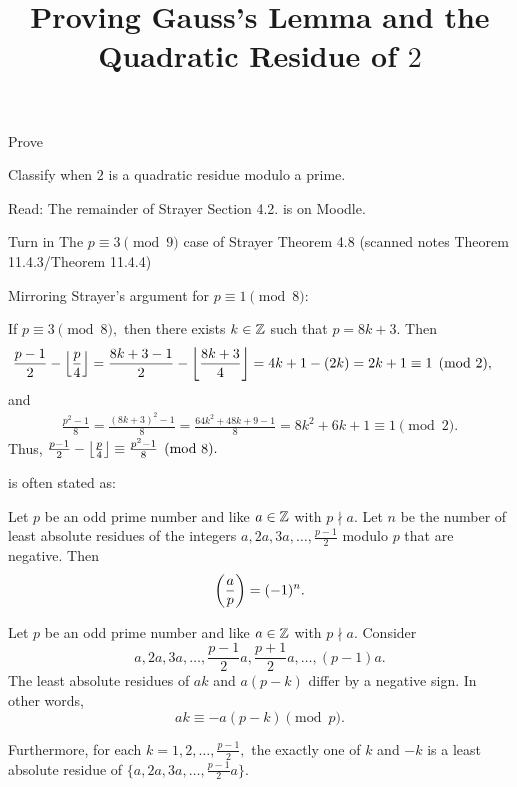 \documentclass{ximera}
\title{Proving Gauss's Lemma and the Quadratic Residue of $2$}
\begin{document}
\begin{abstract}
\end{abstract}
\maketitle

\begin{obj}
    \item Prove 
	\item Classify when $2$ is a quadratic residue modulo a prime.
\end{obj}


\begin{pre}
    \item[Read:] The remainder of Strayer Section 4.2. 
	is on Moodle.
    \item[Turn in] The $p\equiv 3\pmod{9}$
	 case of Strayer Theorem 4.8 (scanned notes Theorem 11.4.3/Theorem 11.4.4)

	 \begin{solution}
		Mirroring Strayer's argument for $p\equiv 1\pmod{8}:$

		If $p\equiv 3\pmod{8},$ then there exists $k\in\mathbb Z$ such that $p=8k+3.$ Then 
			\begin{align*}
				\frac{p-1}{2}-\left\lfloor  \frac{p}{4}\right\rfloor
				&=\frac{8k+3-1}{2}-\left\lfloor \frac{8k+3}{4}\right\rfloor
				=4k+1-(2k)=2k+1
				\equiv 1\pmod{2},
			\end{align*}
		and 
			\begin{align*}
				\frac{p^2-1}{8}=\frac{(8k+3)^2-1}{8}=\frac{64k^2+48k+9-1}{8}=8k^2+6k+1\equiv 1\pmod{2}.
			\end{align*}
		Thus, $\frac{p-1}{2}-\left\lfloor  \frac{p}{4}\right\rfloor\equiv \frac{p^2-1}{8}\pmod{8}.$
	 \end{solution}
\end{pre}


\begin{remark}
	 is often stated as:

	Let $p$ be an odd prime number and like $a\in\mathbb Z$ with $p\nmid a$. Let $n$ be the number of least absolute residues of the integers $a,2a,3a,\dots,\frac{p-1}{2}$ modulo $p$ that are negative. Then \[\left(\frac{a}{p}\right)=(-1)^n.\]
\end{remark}


\begin{lemma}\label{lem:residues-gauss-lem}
	Let $p$ be an odd prime number and like $a\in\mathbb Z$ with $p\nmid a.$ Consider  
	\[a,2a,3a,\dots,\frac{p-1}{2}a,\frac{p+1}{2}a,\dots,(p-1)a.\] The least absolute residues of $ak$ and $a(p-k)$ differ by a negative sign. In other words, 
	\[ak\equiv -a(p-k)\pmod{p}.\]
	
	Furthermore, for each $k=1,2,\dots,\frac{p-1}{2},$ the exactly one of $k$ and $-k$ is a least absolute residue of $\{a,2a,3a,\dots,\frac{p-1}{2}a\}.$
\end{lemma}
\end{document}
